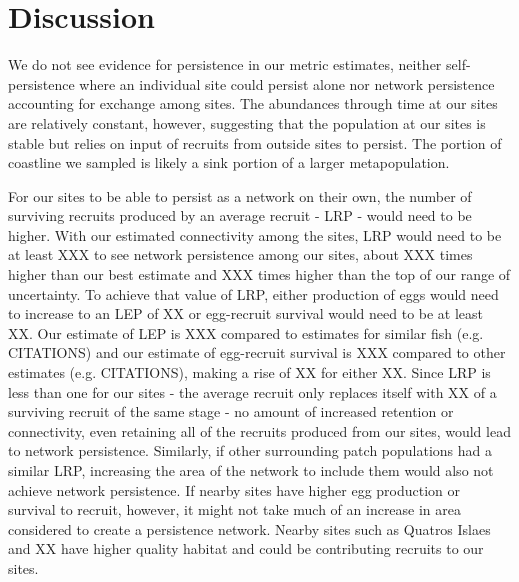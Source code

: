 \documentclass[12pt, oneside]{article}   	%
\begin{document}
\section*{Discussion}

We do not see evidence for persistence in our metric estimates, neither self-persistence where an individual site could persist alone nor network persistence accounting for exchange among sites. The abundances through time at our sites are relatively constant, however, suggesting that the population at our sites is stable but relies on input of recruits from outside sites to persist. The portion of coastline we sampled is likely a sink portion of a larger metapopulation. %

For our sites to be able to persist as a network on their own, the number of surviving recruits produced by an average recruit - LRP - would need to be higher. With our estimated connectivity among the sites, LRP would need to be at least XXX to see network persistence among our sites, about XXX times higher than our best estimate and XXX times higher than the top of our range of uncertainty. To achieve that value of LRP, either production of eggs would need to increase to an LEP of XX or egg-recruit survival would need to be at least XX. Our estimate of LEP is XXX compared to estimates for similar fish (e.g. CITATIONS) and our estimate of egg-recruit survival is XXX compared to other estimates (e.g. CITATIONS), making a rise of XX for either XX. Since LRP is less than one for our sites - the average recruit only replaces itself with XX of a surviving recruit of the same stage - no amount of increased retention or connectivity, even retaining all of the recruits produced from our sites, would lead to network persistence. Similarly, if other surrounding patch populations had a similar LRP, increasing the area of the network to include them would also not achieve network persistence. If nearby sites have higher egg production or survival to recruit, however, it might not take much of an increase in area considered to create a persistence network. Nearby sites such as Quatros Islaes and XX have higher quality habitat and could be contributing recruits to our sites.


\end{document}
